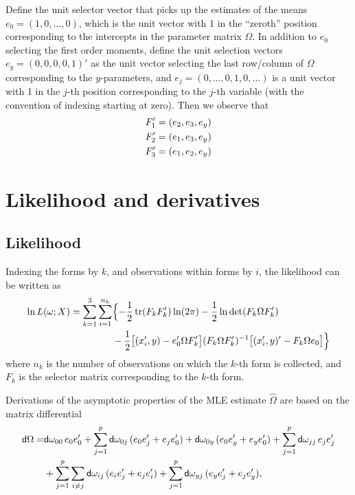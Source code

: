 \documentclass[11pt]{asaproc}
\newcommand{\diff}{{\sf d}}
\newcommand{\trace}{\mathop{\rm tr}}
\begin{document}
Define the unit selector vector
that picks up the estimates of the means $e_0=(1,0,\ldots,0)$, which is the unit vector with 1
in the ``zeroth'' position corresponding to the intercepts in the parameter matrix $\Omega$.
In addition to $e_0$ selecting the first order moments, define the unit selection vectors
$e_y=(0,0,0,0,1)'$ as the unit vector selecting the last row/column of $\Omega$ corresponding to the $y$-parameters,
and $e_j=(0,\ldots,0,1,0,\ldots)$ is a unit vector with 1 in the $j$-th position corresponding to the $j$-th variable
(with the convention of indexing starting at zero). Then we observe that
\begin{align}
    F_1' & = (e_2, e_3, e_y) \notag \\
    F_2' & = (e_1, e_3, e_y) \notag \\
    F_3' & = (e_1, e_2, e_y)
\end{align}

\section{Likelihood and derivatives}

\subsection{Likelihood}

Indexing the forms by $k$, and observations within forms by $i$, the likelihood can be written as
\begin{align}
    \ln L(\omega;X) =
        \sum_{k=1}^3 \sum_{i=1}^{n_k} &
            \Bigl\{
                - \frac12 \trace (F_k F_k') \ln(2\pi)
                - \frac12 \ln \det ( F_k \Omega F_k' )
                \notag \\ &
                - \frac12 \bigl[ (x_i',y) - e_0' \Omega F_k' \bigr] (F_k \Omega F_k')^{-1}
                        \bigl[ (x_i', y)' - F_k \Omega e_0 \bigr]
            \Bigr\}
    \label{eq:log:lkhd}
\end{align}
where $n_k$ is the number of observations on which the $k$-th form is collected,
and $F_k$ is the selector matrix corresponding to the $k$-th form.

Derivations of the asymptotic properties of the MLE estimate $\widehat\Omega$
are based on the matrix differential \citep{magn:neud:1999}
\begin{align}
    \diff \Omega = &
        \diff \omega_{00} \, e_0 e_0'
        + \sum_{j=1}^p \diff \omega_{0j} \, (e_0 e_j' + e_j e_0')
        + \diff \omega_{0y} \, (e_0 e_y' + e_y e_0')
        + \sum_{j=1}^p \diff \omega_{jj} \, e_j e_j'
    \notag \\ &
        + \sum_{j=1}^p \sum_{i\neq j} \diff \omega_{ij} \, (e_i e_j' + e_j e_i')
        + \sum_{j=1}^p \diff \omega_{yj} \, (e_y e_j' + e_j e_y'),
    \label{eq:omega:as:sum:of:e:crossed}
\end{align}
\end{document}
